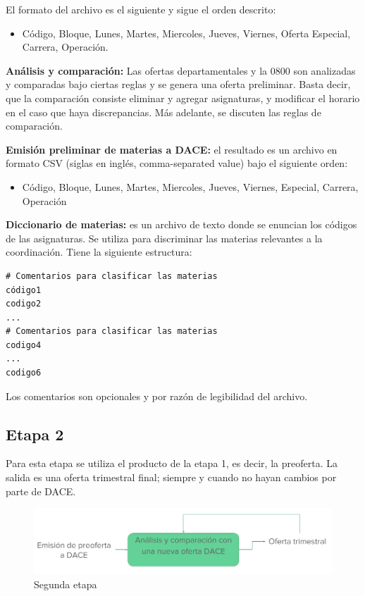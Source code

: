 \documentclass[]{article}
\begin{document}
El formato del archivo es el siguiente y sigue el orden descrito:

\begin{itemize}
\itemsep1pt\parskip0pt
\item
  Código, Bloque, Lunes, Martes, Miercoles, Jueves, Viernes, Oferta
  Especial, Carrera, Operación.
\end{itemize}



\textbf{Análisis y comparación:} Las ofertas departamentales y la 0800
son analizadas y comparadas bajo ciertas reglas y se genera una oferta
preliminar. Basta decir, que la comparación consiste eliminar y agregar
asignaturas, y modificar el horario en el caso que haya discrepancias.
Más adelante, se discuten las reglas de comparación.

\textbf{Emisión preliminar de materias a DACE:} el resultado es un
archivo en formato CSV (siglas en inglés, comma-separated value) bajo el
siguiente orden:

\begin{itemize}
\itemsep1pt\parskip0pt
\item
  Código, Bloque, Lunes, Martes, Miercoles, Jueves, Viernes, Especial,
  Carrera, Operación
\end{itemize}

\textbf{Diccionario de materias:} es un archivo de texto donde se
enuncian los códigos de las asignaturas. Se utiliza para discriminar las
materias relevantes a la coordinación. Tiene la siguiente estructura:

\begin{verbatim}
# Comentarios para clasificar las materias 
código1
codigo2
...
# Comentarios para clasificar las materias 
codigo4
...
codigo6
\end{verbatim}

Los comentarios son opcionales y por razón de legibilidad del archivo.

\subsection{Etapa 2}\label{etapa-2}

Para esta etapa se utiliza el producto de la etapa 1, es decir, la
preoferta. La salida es una oferta trimestral final; siempre y cuando no
hayan cambios por parte de DACE.

\begin{figure}[!h]
  \includegraphics[width=\linewidth]{segunda_etapa.png}
  \caption{Segunda etapa}
  \label{fig:segunda_etapa}
\end{figure}
\end{document}
